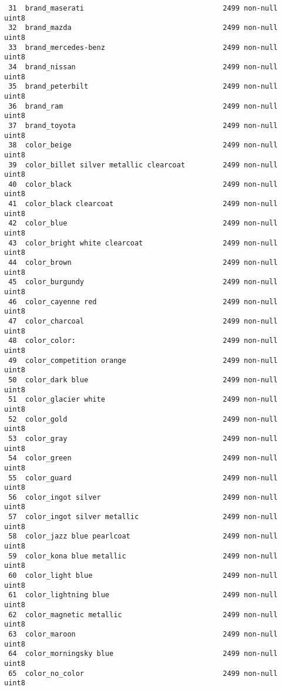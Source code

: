 \documentclass[11pt]{article}
\begin{document}
\begin{verbatim}
 31  brand_maserati                                 2499 non-null   uint8  
 32  brand_mazda                                    2499 non-null   uint8  
 33  brand_mercedes-benz                            2499 non-null   uint8  
 34  brand_nissan                                   2499 non-null   uint8  
 35  brand_peterbilt                                2499 non-null   uint8  
 36  brand_ram                                      2499 non-null   uint8  
 37  brand_toyota                                   2499 non-null   uint8  
 38  color_beige                                    2499 non-null   uint8  
 39  color_billet silver metallic clearcoat         2499 non-null   uint8  
 40  color_black                                    2499 non-null   uint8  
 41  color_black clearcoat                          2499 non-null   uint8  
 42  color_blue                                     2499 non-null   uint8  
 43  color_bright white clearcoat                   2499 non-null   uint8  
 44  color_brown                                    2499 non-null   uint8  
 45  color_burgundy                                 2499 non-null   uint8  
 46  color_cayenne red                              2499 non-null   uint8  
 47  color_charcoal                                 2499 non-null   uint8  
 48  color_color:                                   2499 non-null   uint8  
 49  color_competition orange                       2499 non-null   uint8  
 50  color_dark blue                                2499 non-null   uint8  
 51  color_glacier white                            2499 non-null   uint8  
 52  color_gold                                     2499 non-null   uint8  
 53  color_gray                                     2499 non-null   uint8  
 54  color_green                                    2499 non-null   uint8  
 55  color_guard                                    2499 non-null   uint8  
 56  color_ingot silver                             2499 non-null   uint8  
 57  color_ingot silver metallic                    2499 non-null   uint8  
 58  color_jazz blue pearlcoat                      2499 non-null   uint8  
 59  color_kona blue metallic                       2499 non-null   uint8  
 60  color_light blue                               2499 non-null   uint8  
 61  color_lightning blue                           2499 non-null   uint8  
 62  color_magnetic metallic                        2499 non-null   uint8  
 63  color_maroon                                   2499 non-null   uint8  
 64  color_morningsky blue                          2499 non-null   uint8  
 65  color_no_color                                 2499 non-null   uint8  

\end{verbatim}
\end{document}
